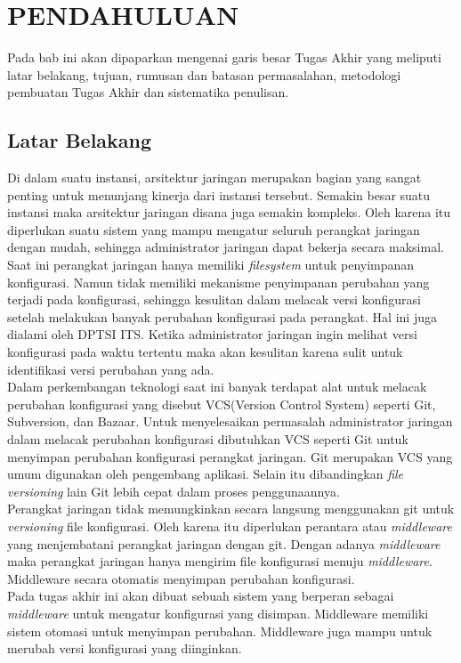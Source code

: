 \chapter{PENDAHULUAN}
	Pada bab ini akan dipaparkan mengenai garis besar Tugas Akhir yang meliputi latar belakang, tujuan, rumusan dan batasan permasalahan, metodologi pembuatan Tugas Akhir dan sistematika penulisan.
        
	\section{Latar Belakang}
		Di dalam suatu instansi, arsitektur jaringan merupakan bagian yang sangat penting untuk menunjang kinerja dari instansi tersebut. Semakin besar suatu instansi maka arsitektur jaringan disana juga semakin kompleks. Oleh karena itu diperlukan suatu sistem yang mampu mengatur seluruh perangkat jaringan dengan mudah, sehingga administrator jaringan dapat bekerja secara maksimal.\\
        \indent Saat ini perangkat jaringan hanya  memiliki \textit{filesystem}  untuk penyimpanan konfigurasi. Namun tidak memiliki mekanisme penyimpanan perubahan yang terjadi pada konfigurasi, sehingga kesulitan dalam melacak versi konfigurasi setelah melakukan banyak perubahan konfigurasi pada perangkat. Hal ini juga dialami oleh DPTSI ITS. Ketika administrator jaringan ingin melihat versi konfigurasi pada waktu tertentu maka akan kesulitan karena sulit untuk identifikasi versi perubahan yang ada.\\
        \indent Dalam perkembangan teknologi saat ini banyak terdapat alat untuk melacak perubahan konfigurasi yang disebut VCS(Version Control System) seperti Git, Subversion, dan Bazaar. Untuk menyelesaikan permasalah administrator jaringan dalam melacak perubahan konfigurasi dibutuhkan VCS seperti Git untuk menyimpan perubahan konfigurasi perangkat jaringan. Git merupakan VCS yang umum digunakan oleh pengembang aplikasi\cite{versioning_popularity}. Selain itu dibandingkan \textit{file versioning} lain Git lebih cepat dalam proses penggunaannya\cite{git_fast}.\\
        \indent Perangkat jaringan tidak memungkinkan secara langsung menggunakan git untuk \textit{versioning} file konfigurasi. Oleh karena itu diperlukan perantara atau \textit{middleware} yang menjembatani perangkat jaringan dengan git. Dengan adanya \textit{middleware} maka perangkat jaringan hanya mengirim file konfigurasi menuju \textit{middleware}. Middleware secara otomatis menyimpan perubahan konfigurasi.\\
	    \indent Pada tugas akhir ini akan dibuat sebuah sistem yang berperan sebagai \textit{middleware} untuk mengatur konfigurasi yang disimpan. Middleware memiliki sistem otomasi untuk menyimpan perubahan. Middleware juga mampu untuk merubah versi konfigurasi yang diinginkan.


